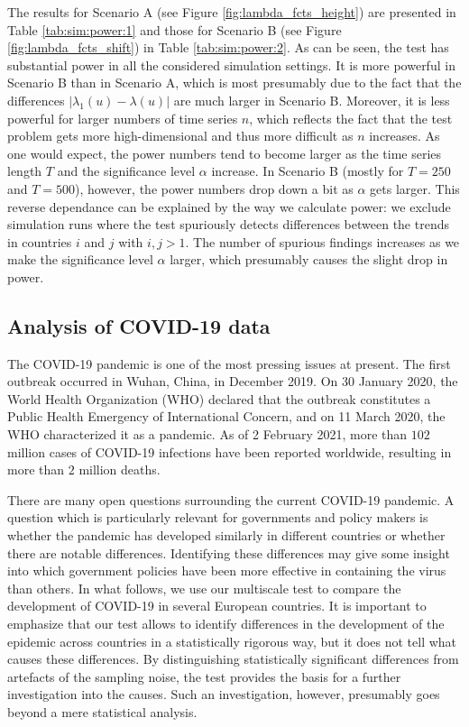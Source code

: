 \documentclass[a4paper,12pt]{article}
\numberwithin{equation}{section}
\begin{document}
The results for Scenario A (see Figure \ref{fig:lambda_fcts_height}) are presented in Table \ref{tab:sim:power:1} and those for Scenario B (see Figure \ref{fig:lambda_fcts_shift}) in Table \ref{tab:sim:power:2}. As can be seen, the test has substantial power in all the considered simulation settings. It is more powerful in Scenario B than in Scenario A, which is most presumably due to the fact that the differences $|\lambda_1(u) - \lambda(u)|$ are much larger in Scenario B. Moreover, it is less powerful for larger numbers of time series $n$, which reflects the fact that the test problem gets more high-dimensional and thus more difficult as $n$ increases. As one would expect, the power numbers tend to become larger as the time series length $T$ and the significance level $\alpha$ increase. In Scenario B (mostly for $T=250$ and $T=500$), however, the power numbers drop down a bit as $\alpha$ gets larger. This reverse dependance can be explained by the way we calculate power: we exclude simulation runs where the test spuriously detects differences between the trends in countries $i$ and $j$ with $i, j > 1$. The number of spurious findings increases as we make the significance level $\alpha$ larger, which presumably causes the slight drop in power.


\subsection{Analysis of COVID-19 data}\label{subsec:app}


The COVID-19 pandemic is one of the most pressing issues at present. The first outbreak occurred in Wuhan, China, in December 2019. On 30 January 2020, the World Health Organization (WHO) declared that the outbreak constitutes a Public Health Emergency of International Concern, and on 11 March 2020, the WHO characterized it as a pandemic. {\color{blue} As of 2 February 2021, more than $102$ million cases of COVID-19 infections have been reported worldwide, resulting in more than $2$ million deaths.}


There are many open questions surrounding the current COVID-19 pandemic. A question which is particularly relevant for governments and policy makers is whether the pandemic has developed similarly in different countries or whether there are notable differences. Identifying these differences may give some insight into which government policies have been more effective in containing the virus than others. In what follows, we use our multiscale test to compare the development of COVID-19 in several European countries. It is important to emphasize that our test allows to identify differences in the development of the epidemic across countries in a statistically rigorous way, but it does not tell what causes these differences. By distinguishing statistically significant differences from artefacts of the sampling noise, the test provides the basis for a further investigation into the causes. Such an investigation, however, presumably goes beyond a mere statistical analysis. 
\end{document}
